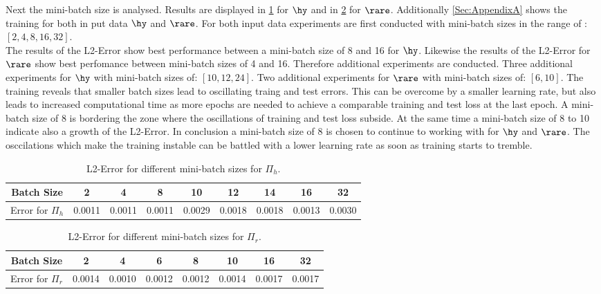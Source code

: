 Next the mini-batch size is analysed. Results are displayed in \cref{Tab:Batch Size Hydro} for $\hy$  and in \cref{Tab:Batch Size Rare} for $\rare$. Additionally \cref{Sec:AppendixA} shows the training for both in put data $\hy$ and $\rare$. For both input data experiments are first conducted with mini-batch sizes in the range of : \([2,4,8,16,32]\).\\ The results of the L2-Error show best performance between a mini-batch size of 8 and 16 for $\hy$. Likewise the results of the L2-Error for $\rare$ show best perfomance between mini-batch sizes of 4 and 16. Therefore additional experiments are conducted. Three additional experiments for $\hy$ with mini-batch sizes of: \([10,12,24]\). Two additional experiments for $\rare$ with mini-batch sizes of: \([6,10]\). The training reveals that smaller batch sizes lead to oscillating traing and test errors. This can be overcome by a smaller learning rate, but also leads to increased computational time as more epochs are needed to achieve a comparable training and test loss at the last epoch. A mini-batch size of 8 is bordering the zone where the oscillations of training and test loss subside. At the same time a mini-batch size of 8 to 10 indicate also a growth of the L2-Error. In conclusion a mini-batch size of 8 is chosen to continue to working with for $\hy$ and $\rare$. The osccilations which make the training instable can be battled with a lower learning rate as soon as training starts to tremble.\\
\begin{table}[!htbp]\centering
	\begin{tabular}{ |c|c|c|c|c|c|c|c|c| }
		\hline
		Batch Size & 2 & 4 & 8 & 10 & 12 & 14 & 16 & 32 \\ [.5ex]
		\hline
		Error for \(\Pi_h\) & 0.0011 & 0.0011 & 0.0011 & 0.0029 & 0.0018& 0.0018 & 0.0013 & 0.0030 \\ \hline
	\end{tabular}
	\caption{L2-Error for different mini-batch sizes for \(\Pi_h\).}
	\label{Tab:Batch Size Hydro}
\end{table}
\begin{table}[!htbp]\centering
	\begin{tabular}{ |c|c|c|c|c|c|c|c| }
		\hline
		Batch Size & 2 & 4 & 6 & 8 & 10 & 16 & 32 \\ [.5ex]
		\hline
		Error for \(\Pi_r\)& 0.0014 & 0.0010 & 0.0012 & 0.0012 & 0.0014 & 0.0017 & 0.0017\\ \hline
	\end{tabular}
	\caption{L2-Error for different mini-batch sizes for \(\Pi_r\).}
	\label{Tab:Batch Size Rare}
\end{table}
